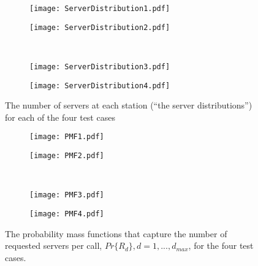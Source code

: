 \documentclass[11pt]{article}\topmargin 0mm
\begin{document}
\begin{figure}
        \centering
        \begin{subfigure}[b]{0.45\textwidth}
                \texttt{[image: ServerDistribution1.pdf]}
                \label{fig:serv_dist1}
        \end{subfigure}
        \begin{subfigure}[b]{0.45\textwidth}
                \texttt{[image: ServerDistribution2.pdf]}
                \label{fig:serv_dist2}
        \end{subfigure}
        \\
        \begin{subfigure}[b]{0.45\textwidth}
                \texttt{[image: ServerDistribution3.pdf]}
                \label{fig:serv_dist3}
        \end{subfigure}
        \begin{subfigure}[b]{0.45\textwidth}
                \texttt{[image: ServerDistribution4.pdf]}
                \label{fig:serv_dist4}
        \end{subfigure}
        \caption{The number of servers at each station (``the server distributions'') for each of the four test cases}\label{fig:server_dists}
\end{figure}

\begin{figure}
        \centering
        \begin{subfigure}[b]{0.45\textwidth}
                \texttt{[image: PMF1.pdf]}
                \label{fig:pmf1}
        \end{subfigure}
        \begin{subfigure}[b]{0.45\textwidth}
                \texttt{[image: PMF2.pdf]}
                \label{fig:pmf2}
        \end{subfigure}
        \\
        \begin{subfigure}[b]{0.45\textwidth}
                \texttt{[image: PMF3.pdf]}
                \label{fig:pmf3}
        \end{subfigure}
        \begin{subfigure}[b]{0.45\textwidth}
                \texttt{[image: PMF4.pdf]}
                \label{fig:pmf4}
        \end{subfigure}
        \caption{The probability mass functions that capture the number of requested servers per call, $Pr\{R_d\}, d=1,...,d_{max}$, for the four test cases.}\label{fig:pmfs}
\end{figure}
\end{document}
